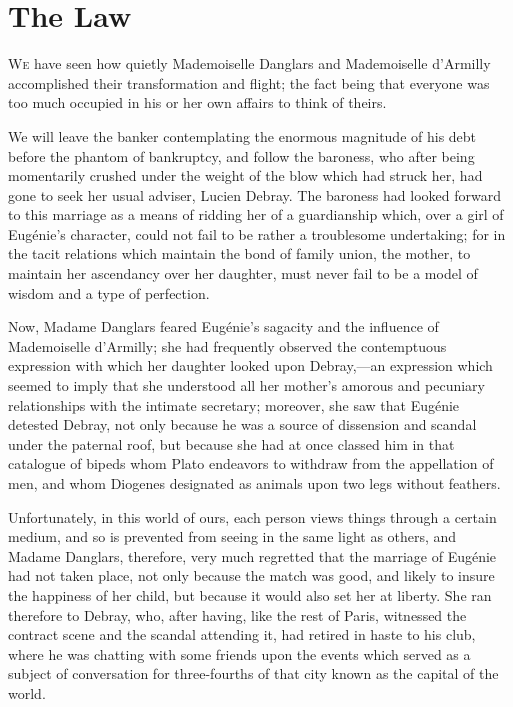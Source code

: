 \chapter{The Law} 

 \lettrine{W}{e} have seen how quietly Mademoiselle Danglars and Mademoiselle d'Armilly accomplished their transformation and flight; the fact being that everyone was too much occupied in his or her own affairs to think of theirs. 

 We will leave the banker contemplating the enormous magnitude of his debt before the phantom of bankruptcy, and follow the baroness, who after being momentarily crushed under the weight of the blow which had struck her, had gone to seek her usual adviser, Lucien Debray. The baroness had looked forward to this marriage as a means of ridding her of a guardianship which, over a girl of Eugénie's character, could not fail to be rather a troublesome undertaking; for in the tacit relations which maintain the bond of family union, the mother, to maintain her ascendancy over her daughter, must never fail to be a model of wisdom and a type of perfection. 

 Now, Madame Danglars feared Eugénie's sagacity and the influence of Mademoiselle d'Armilly; she had frequently observed the contemptuous expression with which her daughter looked upon Debray,—an expression which seemed to imply that she understood all her mother's amorous and pecuniary relationships with the intimate secretary; moreover, she saw that Eugénie detested Debray, not only because he was a source of dissension and scandal under the paternal roof, but because she had at once classed him in that catalogue of bipeds whom Plato endeavors to withdraw from the appellation of men, and whom Diogenes designated as animals upon two legs without feathers. 

 Unfortunately, in this world of ours, each person views things through a certain medium, and so is prevented from seeing in the same light as others, and Madame Danglars, therefore, very much regretted that the marriage of Eugénie had not taken place, not only because the match was good, and likely to insure the happiness of her child, but because it would also set her at liberty. She ran therefore to Debray, who, after having, like the rest of Paris, witnessed the contract scene and the scandal attending it, had retired in haste to his club, where he was chatting with some friends upon the events which served as a subject of conversation for three-fourths of that city known as the capital of the world. 

